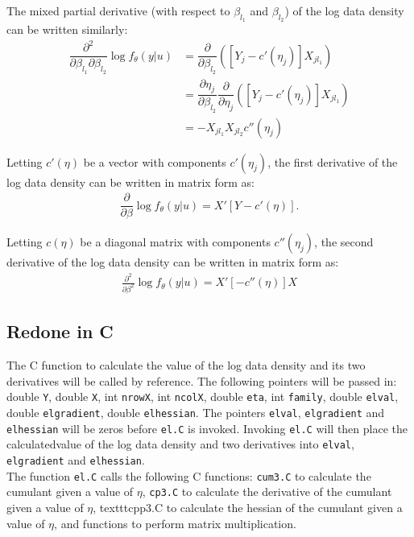 \documentclass{article}
\begin{document}
The mixed partial derivative (with respect to $\beta_{l_1}$ and $\beta_{l_2}$) of the log data density can be written similarly:
\begin{align}
\dfrac{\partial^2}{\partial \beta_{l_1} \partial \beta_{l_2}}  \log f_\theta(y|u) &=\dfrac{\partial}{\partial \beta_{l_2}} \left( \left[ Y_j-c'(\eta_j) \right]  X_{j{l_1}} \right) \\
&= \dfrac{\partial \eta_j}{\partial \beta_{l_2}} \dfrac{\partial}{\partial \eta_j} \left( \left[ Y_j-c'(\eta_j) \right]  X_{j{l_1}} \right) \\
&= -X_{j{l_1}} X_{j{l_2}} c''(\eta_j) 
 \end{align}


Letting $c'(\eta)$ be a vector with components $c'(\eta_j)$, the first derivative of the log data density can be written in matrix form as:
\begin{align}
\dfrac{\partial}{\partial \beta}  \log f_\theta(y|u) = X' \left[ Y-  c'(\eta)  \right].
\end{align}

Letting $ c(\eta)$ be a diagonal matrix with components $c''(\eta_j)$, the second derivative of the log data density can be written in matrix form as:
\begin{align}
   \frac{\partial^2}{\partial \beta^2} \log f_\theta(y|u) =   X' [ -  c''(\eta) ] X
\end{align}

\subsection{Redone in C}
The C function to calculate the value of the log data density and its two derivatives will be called by reference. The following pointers will be passed in: double \texttt{Y}, double \texttt{X}, int \texttt{nrowX}, int \texttt{ncolX}, double \texttt{eta}, int \texttt{family}, double \texttt{elval}, double \texttt{elgradient}, double \texttt{elhessian}. The pointers  \texttt{elval}, \texttt{elgradient} and \texttt{elhessian} will be zeros before \texttt{el.C} is invoked. Invoking \texttt{el.C} will then place the calculatedvalue of the log data density and two derivatives into \texttt{elval}, \texttt{elgradient} and \texttt{elhessian}.\\

The function \texttt{el.C} calls the following C functions: \texttt{cum3.C} to calculate the cumulant given a value of $\eta$, \texttt{cp3.C} to calculate the derivative of the cumulant given a value of $\eta$, texttt{cpp3.C} to calculate the hessian of the cumulant given a value of $\eta$, and functions to perform matrix multiplication.
\end{document}
